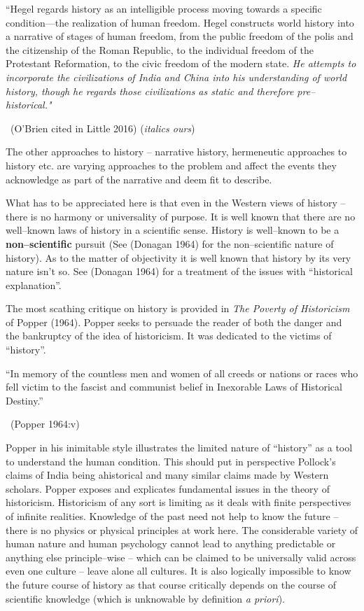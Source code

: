 \begin{myquote}
“Hegel regards history as an intelligible process moving towards a specific condition—the realization of human freedom. Hegel constructs world history into a narrative of stages of human freedom, from the public freedom of the polis and the citizenship of the Roman Republic, to the individual freedom of the Protestant Reformation, to the civic freedom of the modern state. \textit{He attempts to incorporate the civilizations of India and China into his understanding of world history, though he regards those civilizations as static and therefore pre–historical."} 

~\hfill (O'Brien cited in Little 2016) (\textit{italics ours})
\end{myquote}

The other approaches to history – narrative history, hermeneutic approaches to history etc. are varying approaches to the problem and affect the events they acknowledge as part of the narrative and deem fit to describe.

What has to be appreciated here is that even in the Western views of history – there is no harmony or universality of purpose. It is well known that there are no well–known laws of history in a scientific sense. History is well–known to be a \textbf{non–scientific} pursuit (See (Donagan 1964) for the non–scientific nature of history). As to the matter of objectivity it is well known that history by its very nature isn’t so. See (Donagan 1964) for a treatment of the issues with “historical explanation”.

The most scathing critique on history is provided in \textit{The Poverty of Historicism} of Popper (1964). Popper seeks to persuade the reader of both the danger and the bankruptcy of the idea of historicism. It was dedicated to the victims of “history”.

\begin{myquote}
“In memory of the countless men and women of all creeds or nations or races who fell victim to the fascist and communist belief in Inexorable Laws of Historical Destiny.” 

~\hfill (Popper 1964:v)
\end{myquote}

Popper in his inimitable style illustrates the limited nature of “history” as a tool to understand the human condition. This should put in perspective Pollock’s claims of India being ahistorical and many similar claims made by Western scholars. Popper exposes and explicates fundamental issues in the theory of historicism. Historicism of any sort is limiting as it deals with finite perspectives of infinite realities. Knowledge of the past need not help to know the future – there is no physics or physical principles at work here. The considerable variety of human nature and human psychology cannot lead to anything predictable or anything else principle–wise – which can be claimed to be universally valid across even one culture – leave alone all cultures. It is also logically impossible to know the future course of history as that course critically depends on the course of scientific knowledge (which is unknowable by definition \textit{a priori}).


